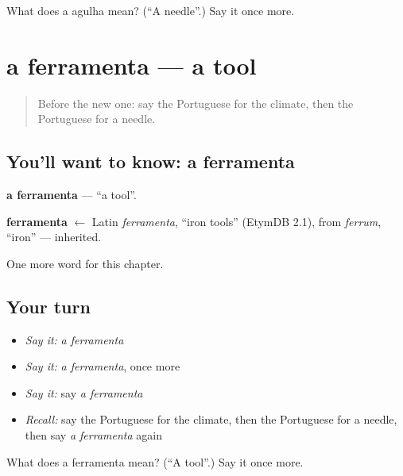 \begin{tcolorbox}[breakable,colback=teal!4,colframe=teal!35!black,title={Before you move on}]
What does a agulha mean? (\textquotedblleft{}A needle\textquotedblright{}.) Say it once more.
\end{tcolorbox}
\section[a ferramenta]{a ferramenta — a tool}

\label{lesson:PT-C196-ferramenta}



\begin{quote}
Before the new one: say the Portuguese for the climate, then the Portuguese for a needle.
\end{quote}

\subsection*{You'll want to know: a ferramenta}
\textbf{a ferramenta} — \textquotedblleft{}a tool\textquotedblright{}.

\begin{cousinweb}
\textbf{ferramenta} $\leftarrow$ Latin \emph{ferramenta}, \textquotedblleft{}iron tools\textquotedblright{} (EtymDB 2.1), from \emph{ferrum}, \textquotedblleft{}iron\textquotedblright{} — inherited.
\end{cousinweb}

\begin{grammarlens}[title={What you've built}]
One more word for this chapter.
\end{grammarlens}

\subsection*{Your turn}
\begin{itemize}
\raggedright
  \item \emph{Say it:} \emph{a ferramenta}
  \item \emph{Say it:} \emph{a ferramenta}, once more
  \item \emph{Say it:} say \emph{a ferramenta}
  \item \emph{Recall:} say the Portuguese for the climate, then the Portuguese for a needle, then say \emph{a ferramenta} again
\end{itemize}

\begin{tcolorbox}[breakable,colback=teal!4,colframe=teal!35!black,title={Before you move on}]
What does a ferramenta mean? (\textquotedblleft{}A tool\textquotedblright{}.) Say it once more.
\end{tcolorbox}
